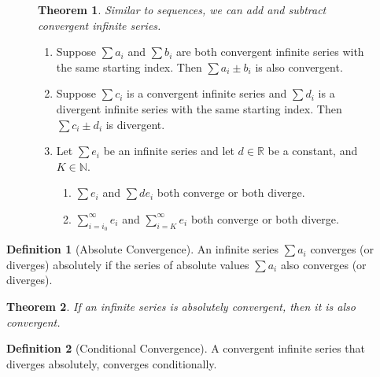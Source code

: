 \documentclass{article}
\newcommand*{\N}{\mathbb{N}}
\newcommand*{\R}{\mathbb{R}}
\theoremstyle{plain}
\newtheorem{theorem}{Theorem}[section]
\numberwithin{theorem}{subsection}
\theoremstyle{definition}
\newtheorem{definition}{Definition}[section]
\numberwithin{definition}{subsection}
\theoremstyle{remark}
\numberwithin{note}{subsection}
\begin{document}
\begin{figure}[H]
	\begin{mdframed}[style=exampledefault]
		\begin{theorem}
			Similar to sequences, we can add and subtract convergent infinite series.
		\end{theorem}

		\begin{enumerate}
			\item Suppose $\sum a_i$ and $\sum b_i$ are both convergent infinite series with the same starting index. Then $\sum a_i \pm b_i$ is also convergent.
			\item Suppose $\sum c_i$ is a convergent infinite series and $\sum d_i$ is a divergent infinite series with the same starting index. Then $\sum c_i \pm d_i$ is divergent.
			\item Let $\sum e_i$ be an infinite series and let $d\in\R$ be a constant, and $K\in\N$.
			\begin{enumerate}
				\item $\sum e_i$ and $\sum d e_i$ both converge or both diverge.
				\item $\sum_{i=i_0}^\infty e_i$ and $\sum_{i=K}^\infty e_i$ both converge or both diverge.
			\end{enumerate}
		\end{enumerate}

	\end{mdframed}
\end{figure}
%
\begin{definition}[Absolute Convergence]
	An infinite series $\sum a_i$ converges (or diverges) absolutely if the series of absolute values $\sum a_i$ also converges (or diverges).
\end{definition}
\begin{theorem}
	If an infinite series is absolutely convergent, then it is also convergent.
\end{theorem}
%
\begin{definition}[Conditional Convergence]
	A convergent infinite series that diverges absolutely, converges conditionally.
\end{definition}
%
\pagebreak
\end{document}
